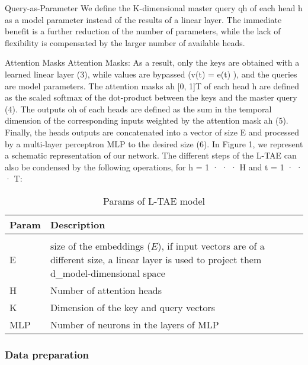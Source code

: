 \begin{paragraph}{Query-as-Parameter} 
We define the K-dimensional master query qh of each head
h as a model parameter instead of the results of a linear layer. The immediate
benefit is a further reduction of the number of parameters, while the lack of
flexibility is compensated by the larger number of available heads.
\end{paragraph} 

\begin{paragraph}{Attention Masks}
Attention Masks: As a result, only the keys are obtained with a learned linear
layer (3), while values are bypassed (v(t) = e(t)
), and the queries are model
parameters. The attention masks ah  [0, 1]T of each head h are defined as the
scaled softmax of the dot-product between the keys and the master query (4).
The outputs oh of each heads are defined as the sum in the temporal dimension
of the corresponding inputs weighted by the attention mask ah (5). Finally,
the heads outputs are concatenated into a vector of size E and processed by a
multi-layer perceptron MLP to the desired size (6). In Figure 1, we represent a
schematic representation of our network. The different steps of the L-TAE can
also be condensed by the following operations, for h = 1 · · · H and t = 1 · · · T:
\end{paragraph}

\begin{table}[ht]
  \centering
  \begin{tabular}{l p{12cm}}   
     Param & Description \\[0.2cm] 
     \hline \\[-0.2cm]  
     E & size of the embeddings ($E$), if input vectors are of a different size, a linear layer is used to project them d\_model-dimensional space \\
     H & Number of attention heads  \\
     K & Dimension of the key and query vectors  \\
     MLP & Number of neurons in the layers of MLP \\
  \end{tabular}
  \caption{Params of L-TAE model}
  \label{tab:LTAEconfig}
\end{table} 

\subsubsection{Data preparation}

